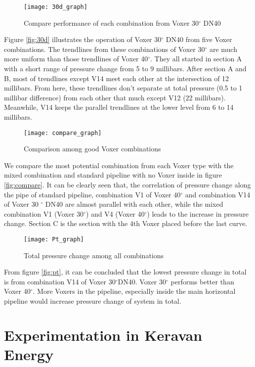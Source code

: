 \begin{figure}[h!]
  \centering
  \texttt{[image: 30d\_graph]}
  \caption{Compare performance of each combination from Voxer 30$^{\circ}$ DN40}
  \label{fig:30d}
\end{figure}

Figure \vref{fig:30d} illustrates the operation of Voxer 30$^{\circ}$ DN40 from five Voxer combinations. The trendlines from these combinations of Voxer 30$^{\circ}$ are much more uniform than those trendlines of Voxer 40$^{\circ}$. They all started in section A with a short range of pressure change from 5 to 9 millibars. After section A and B, most of trendlines except V14 meet each other at the intersection of 12 millibars. From here, these trendlines don't separate at total pressure (0.5 to 1 millibar difference) from each other that much except V12 (22 millibars). Meanwhile, V14 keeps the parallel trendlines at the lower level from 6 to 14 millibars.

\begin{figure}[h!]
  \centering
  \texttt{[image: compare\_graph]}
  \caption{ Comparison among good Voxer combinations }
  \label{fig:compare}
\end{figure}

We compare the most potential combination from each Voxer type with the mixed combination and standard pipeline with no Voxer inside in figure \vref{fig:compare}. It can be clearly seen that, the correlation of pressure change along the pipe of standard pipeline, combination V1 of Voxer 40$^{\circ}$ and combination V14 of Voxer 30 $^{\circ}$ DN40 are almost parallel with each other, while the mixed combination V1 (Voxer 30$^{\circ}$) and V4 (Voxer 40$^{\circ}$) leads to the increase in pressure change. Section C is the section with the 4th Voxer placed before the last curve.

\begin{figure}[h!]
  \centering
  \texttt{[image: Pt\_graph]}
  \caption{ Total pressure change among all combinations}
  \label{fig:pt}
\end{figure}

From figure \vref{fig:pt}, it can be concluded that the lowest pressure change in total is from combination V14 of Voxer 30$^{\circ}$DN40. Voxer 30$^{\circ}$ performs better than Voxer 40$^{\circ}$. More Voxers in the pipeline, especially inside the main horizontal pipeline would increase pressure change of system in total.  

\section{Experimentation in Keravan Energy}

